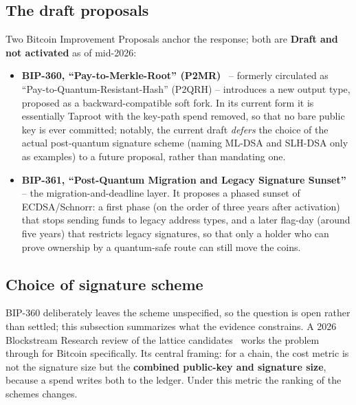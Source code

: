 \subsection{The draft proposals}
Two Bitcoin Improvement Proposals anchor the response; both are \textbf{Draft and not activated} as of mid-2026:

\begin{itemize}
  \item \textbf{BIP-360, ``Pay-to-Merkle-Root'' (P2MR)}~\cite{bip360} -- formerly circulated as ``Pay-to-Quantum-Resistant-Hash'' (P2QRH) -- introduces a new output type, proposed as a backward-compatible soft fork. In its current form it is essentially Taproot with the key-path spend removed, so that no bare public key is ever committed; notably, the current draft \emph{defers} the choice of the actual post-quantum signature scheme (naming ML-DSA and SLH-DSA only as examples) to a future proposal, rather than mandating one.
  \item \textbf{BIP-361, ``Post-Quantum Migration and Legacy Signature Sunset''}~\cite{bip361} -- the migration-and-deadline layer. It proposes a phased sunset of ECDSA/Schnorr: a first phase (on the order of three years after activation) that stops sending funds to legacy address types, and a later flag-day (around five years) that restricts legacy signatures, so that only a holder who can prove ownership by a quantum-safe route can still move the coins.
\end{itemize}

\subsection{Choice of signature scheme}
\label{sec:bitcoin-scheme-choice}

BIP-360 deliberately leaves the scheme unspecified, so the question is open
rather than settled; this subsection summarizes what the evidence constrains. A 2026 Blockstream Research review of the lattice
candidates~\cite{blockstreamlattice2026} works the problem through for Bitcoin
specifically. Its central framing: for a chain, the cost metric is not the
signature size but the \textbf{combined public-key and signature size}, because
a spend writes both to the ledger. Under this metric the ranking of the schemes
changes.

